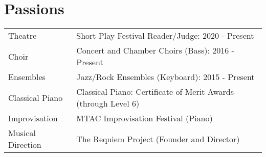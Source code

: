 \documentclass[letter,10pt]{article}
\begin{document}
\section{Passions}
\begin{tabularx}{\linewidth}{@{}l X@{}}	
    Theatre & Short Play Festival Reader/Judge: 2020 - Present \\[2.75pt]
    Choir & Concert and Chamber Choirs (Bass): 2016 - Present \\[2.75pt]
    Ensembles & Jazz/Rock Ensembles (Keyboard): 2015 - Present \\[2.75pt]
    Classical Piano & Classical Piano: Certificate of Merit Awards (through Level 6) \\[2.75pt]
    Improvisation & MTAC Improvisation Festival (Piano) \\[2.75pt]
    Musical Direction & The Requiem Project (Founder and Director)
\end{tabularx}



\end{document}
